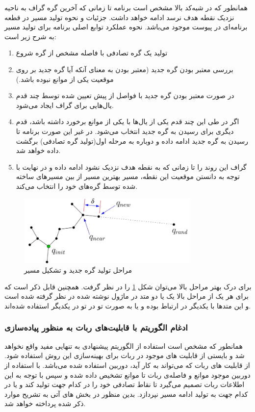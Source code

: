 همانطور که در شبه‌کد بالا مشخص است برنامه تا زمانی که آخرین گره گراف به ناحیه نزدیک نقطه هدف نرسد ادامه خواهد داشت. جزئیات و نحوه تولید مسیر در قطعه برنامه‌ای در پیوست موجود می‌باشد. نحوه عملکرد توابع اصلی برنامه برای تولید مسیر به شرح زیر است:
\begin{enumerate}
	\item
	تولید یک گره تصادفی با فاصله مشخص از گره شروع
	\item
	بررسی معتبر بودن گره جدید (معتبر بودن به معنای آنکه آیا گره جدید بر روی موقعیت یکی از موانع نبوده باشد.)
	\item
	در صورت معتبر بودن گره جدید با فواصل از پیش تعیین شده توسط چند قدم یال‌هایی برای گراف ایجاد می‌شود.
	\item
	اگر در طی این چند قدم یکی از یال‌ها با یکی از موانع برخورد داشته باشد، قدم دیگری برای رسیدن به گره جدید انتخاب می‌شود. در غیر این صورت برنامه تا رسیدن به گره جدید ادامه داده و دوباره به مرحله اول(تولید گره تصادفی) برگشت داده خواهد شد.
	\item
	گراف این روند را تا زمانی که به نقطه هدف نزدیک نشود ادامه داده و در نهایت با توجه به دانستن موقعیت این نقطه، مسیر بهترین مسیر از بین مسیر‌های ساخته شده توسط گره‌های خود را انتخاب می‌کند.
\end{enumerate}

\begin{figure}[H]
	\centering
	\includegraphics[width=0.8\textwidth]{./images/Chapter2/NewNodeSteps_without_background}	
	\caption[مراحل تولید گره جدید و تشکیل مسیر]{مراحل تولید گره جدید و تشکیل مسیر\cite{Algobotics}}
	\label{مراحل تولید گره جدید}
\end{figure}
\noindent
\unskip

برای درک بهتر مراحل بالا می‌توان شکل
\ref{مراحل تولید گره جدید}
را در نظر گرفت. همچنین قابل ذکر است که برای هر یک از مراحل بالا یک یا دو متد
\noindent\unskip{}
در ماژول نوشته شده در نظر گرفته شده است و این متد‌ها با یکدیگر در ارتباط بوده و یا به صورت تو در تو
 \noindent\unskip{}
در یکدیگر استفاده شده‌اند. 

\subsubsection{ادغام الگوریتم با قابلیت‌های ربات به منظور پیاده‌سازی}
همانطور که مشخص است استفاده از الگوریتم پیشنهادی به تنهایی مفید واقع نخواهد شد و بایستی از قابلیت های موجود در ربات برای بهینه‌سازی این روش استفاده شود. از قابلیت های ربات که می‌تواند به کار آید، دوربین استفاده شده می‌باشد. با استفاده از دوربین موجود موانع و فاصله‌ی ربات تا موانع تشخیص داده شده و سپس با توجه به این اطلاعات ربات تصمیم می‌گیرد تا نقاط تصادفی خود را در کدام جهت تولید کند و یا در کدام جهت به تولید ادامه مسیر نپردازد. بدین منظور در بخش های آتی به تشریح موارد ذکر شده پرداخته خواهد شد.

